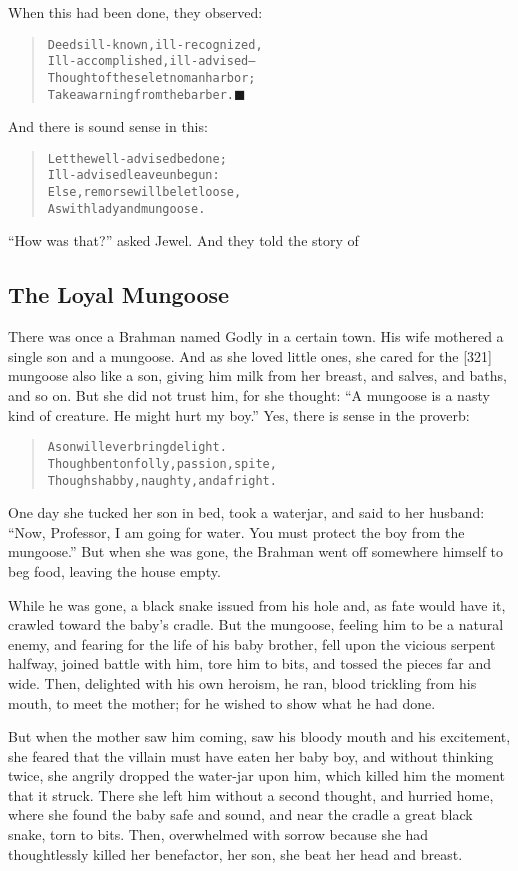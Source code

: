 \documentclass[article, twoside, 14pt]{memoir}
\newcommand{\qed}{\hfill \ensuremath{\blacksquare}}
\renewenvironment{verbatim}{%
\begin{quote}%
\vskip -10pt%
\begin{alltt}\normalfont\large}{\end{alltt}%
\end{quote}%
\vskip -10pt
} %
\begin{document}
When this had been done, they observed:

\begin{verbatim}
Deeds ill-known, ill-recognized,
Ill-accomplished, ill-advised--
Thought of these let no man harbor;
Take a warning from the barber.\hyperref[s79]{\qed}
\end{verbatim}
And there is sound sense in this:

\begin{verbatim}
Let the well-advised be done;
Ill-advised leave unbegun:
Else, remorse will be let loose,
As with lady and mungoose.
\end{verbatim}
``How was that?'' asked Jewel. And they told the story of

\subsection{The Loyal Mungoose}

\label{s80}

There was once a Brahman named Godly in a certain town. His wife
mothered a single son and a mungoose. And as she loved little ones,
she cared for the [321] mungoose also like a son, giving him milk
from her breast, and salves, and baths, and so on. But she did not
trust him, for she thought:
``A mungoose is a nasty kind of creature. He might hurt my boy.''
Yes, there is sense in the proverb:

\begin{verbatim}
A son will ever bring delight.
Though bent on folly, passion, spite,
Though shabby, naughty, and a fright.
\end{verbatim}
One day she tucked her son in bed, took a waterjar, and said to her
husband:
``Now, Professor, I am going for water. You must protect the boy from the mungoose.''
But when she was gone, the Brahman went off somewhere himself to
beg food, leaving the house empty.

While he was gone, a black snake issued from his hole and, as fate
would have it, crawled toward the baby's cradle. But the mungoose,
feeling him to be a natural enemy, and fearing for the life of his
baby brother, fell upon the vicious serpent halfway, joined battle
with him, tore him to bits, and tossed the pieces far and wide.
Then, delighted with his own heroism, he ran, blood trickling from
his mouth, to meet the mother; for he wished to show what he had
done.

But when the mother saw him coming, saw his bloody mouth and his
excitement, she feared that the villain must have eaten her baby
boy, and without thinking twice, she angrily dropped the water-jar
upon him, which killed him the moment that it struck. There she
left him without a second thought, and hurried home, where she
found the baby safe and sound, and near the cradle a great black
snake, torn to bits. Then, overwhelmed with sorrow because she had
thoughtlessly killed her benefactor, her son, she beat her head and
breast.
\end{document}
